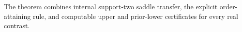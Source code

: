 The theorem combines internal support-two saddle transfer, the explicit order-attaining rule, and computable upper and prior-lower certificates for every real contrast.